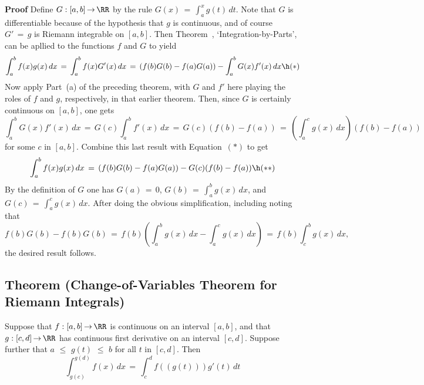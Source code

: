         {\bf Proof} Define $G:[a,b] \,{\rightarrow}\, {\RR}$ by the rule $G(x) \,=\, {\displaystyle \int_{a}^{x} g(t)\,dt}$.
    Note that $G$ is differentiable because of the hypothesis that $g$ is continuous, and of course $G' \,=\, g$ is Riemann integrable on $[a,b]$.
    Then Theorem~, `Integration-by-Parts', can be apllied to the functions $f$ and $G$ to yield
        \begin{displaymath}
        \int_{a}^{b} f(x)g(x)\,dx \,=\, \int_{a}^{b} f(x)G'(x)\,dx \,=\, 
        \left(f(b)G(b) - f(a)G(a)\right) - \int_{a}^{b} G(x)f'(x)\,dx \h ({\ast})
        \end{displaymath}
    Now apply Part~(a) of the preceding theorem, with $G$ and $f'$ here playing the roles of $f$ and $g$, respectively, in that earlier theorem.
    Then, since $G$ is certainly continuous on $[a,b]$, one gets
        \begin{displaymath}
        \int_{a}^{b} G(x)f'(x)\,dx \,=\, G(c)\int_{a}^{b} f'(x)\,dx \,=\, G(c)(f(b)-f(a)) \,=\, \left(\int_{a}^{c} g(x)\,dx\right)(f(b)-f(a))
        \end{displaymath}
    for some $c$ in $[a,b]$. Combine this last result with Equation~$({\ast})$ to get
        \begin{displaymath}
        \int_{a}^{b} f(x)g(x)\,dx\,=\, 
        \left(f(b)G(b) - f(a)G(a)\right) - G(c)(f(b)-f(a)) \h ({\ast}{\ast})
        \end{displaymath}
    By the definition of $G$ one has $G(a) \,=\, 0$, $G(b) \,=\, {\displaystyle \int_{a}^{b} g(x)\,dx}$, and ${\displaystyle G(c) \,=\, \int_{a}^{c} g(x)\,dx}$.
    After doing the obvious simplification, including noting that
        \begin{displaymath}
         f(b)G(b) - f(b)G(b) \,=\, f(b)\left(\int_{a}^{b} g(x)\,dx - \int_{a}^{c} g(x)\,dx\right) \,=\, f(b)\int_{c}^{b} g(x)\,dx,
        \end{displaymath}
    the desired result follows.

\V
\V

        \subsection{\small{{\bf Theorem} (Change-of-Variables Theorem for Riemann Integrals)}}
        \label{ThmH50.50}

\V

        Suppose that $f:[a,b] \,{\rightarrow}\, {\RR}$ is continuous on an interval $[a,b]$,
    and that $g:[c,d] \,{\rightarrow}\, {\RR}$ has continuous first derivative on an interval $[c,d]$.
    Suppose further that $a\,\,{\leq}\,\,g(t)\,\,{\leq}\,\,b$ for all $t$ in $[c,d]$.
    Then
        \begin{equation}
        \label{EqnH.50}
        \int_{g(c)}^{g(d)} f(x)\,dx \,=\, \int_{c}^{d} f((g(t)))g'(t)\,dt
        \end{equation}

